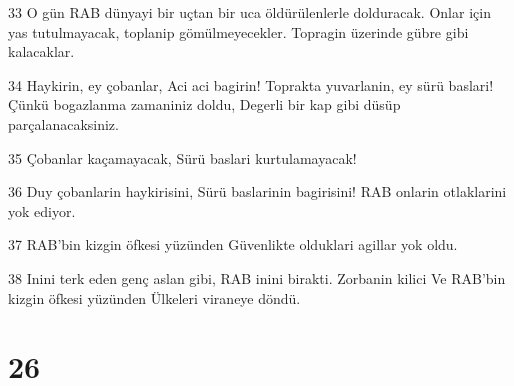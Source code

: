 \par 33 O gün RAB dünyayi bir uçtan bir uca öldürülenlerle dolduracak. Onlar için yas tutulmayacak, toplanip gömülmeyecekler. Topragin üzerinde gübre gibi kalacaklar.
\par 34 Haykirin, ey çobanlar, Aci aci bagirin! Toprakta yuvarlanin, ey sürü baslari! Çünkü bogazlanma zamaniniz doldu, Degerli bir kap gibi düsüp parçalanacaksiniz.
\par 35 Çobanlar kaçamayacak, Sürü baslari kurtulamayacak!
\par 36 Duy çobanlarin haykirisini, Sürü baslarinin bagirisini! RAB onlarin otlaklarini yok ediyor.
\par 37 RAB'bin kizgin öfkesi yüzünden Güvenlikte olduklari agillar yok oldu.
\par 38 Inini terk eden genç aslan gibi, RAB inini birakti. Zorbanin kilici Ve RAB'bin kizgin öfkesi yüzünden Ülkeleri viraneye döndü.

\chapter{26}

